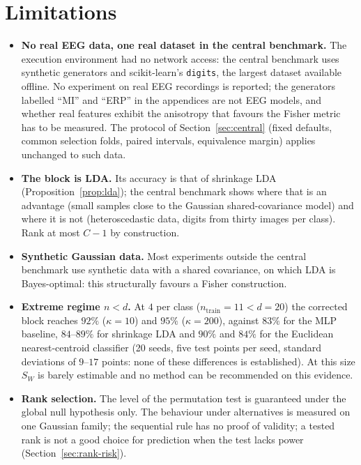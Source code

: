 \documentclass[11pt,a4paper]{article}
\theoremstyle{plain}
\theoremstyle{definition}
\theoremstyle{remark}
\begin{document}
\section{Limitations}
\label{sec:limits}
\begin{itemize}
  \item \textbf{No real EEG data, one real dataset in the central
  benchmark.} The execution environment had no network access: the central
  benchmark uses synthetic generators and scikit-learn's \texttt{digits},
  the largest dataset available offline. No experiment on real EEG
  recordings is reported; the generators labelled ``MI'' and ``ERP'' in the
  appendices are not EEG models, and whether real features exhibit the
  anisotropy that favours the Fisher metric has to be measured. The
  protocol of Section~\ref{sec:central} (fixed defaults, common selection
  folds, paired intervals, equivalence margin) applies unchanged to such
  data.
  \item \textbf{The block is LDA.} Its accuracy is that of shrinkage LDA
  (Proposition~\ref{prop:lda}); the central benchmark shows where that is
  an advantage (small samples close to the Gaussian shared-covariance
  model) and where it is not (heteroscedastic data, digits from thirty
  images per class). Rank at most $C-1$ by construction.
  \item \textbf{Synthetic Gaussian data.} Most experiments outside the
  central benchmark use synthetic data with a shared covariance, on which
  LDA is Bayes-optimal: this structurally favours a Fisher construction.
  \item \textbf{Extreme regime $n<d$.} At $4$ per class
  ($n_{\mathrm{train}}=11<d=20$) the corrected block reaches $92\%$ ($\kappa=10$)
  and $95\%$ ($\kappa=200$), against $83\%$ for the MLP baseline, $84$--$89\%$
  for shrinkage LDA and $90\%$ and $84\%$ for the Euclidean nearest-centroid
  classifier (20 seeds, five test points per seed, standard deviations of
  $9$--$17$ points: none of these differences is established). At this size $S_W$ is barely
  estimable and no method can be recommended on this evidence.
  \item \textbf{Rank selection.} The level of the permutation test is
  guaranteed under the global null hypothesis only. The behaviour under
  alternatives is measured on one Gaussian family; the sequential rule has
  no proof of validity; a tested rank is not a good choice for prediction
  when the test lacks power (Section~\ref{sec:rank-risk}).

\end{itemize}
\end{document}
